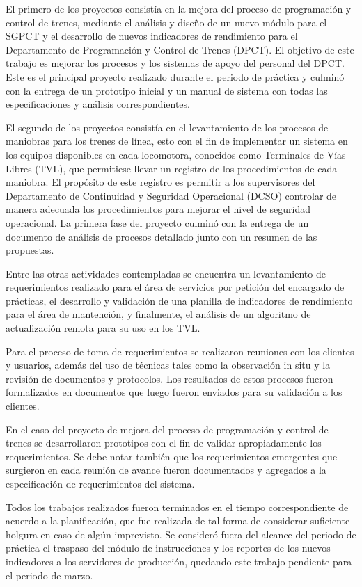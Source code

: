 \documentclass[oneside,12pt, letterpaper, titlepage]{book}
\begin{document}
El primero de los proyectos consistía en la mejora del proceso de programación y control de trenes, mediante el análisis y diseño de un nuevo módulo para el SGPCT y el desarrollo de nuevos indicadores de rendimiento para el Departamento de Programación y Control de Trenes (DPCT). El objetivo de este trabajo es mejorar los procesos y los sistemas de apoyo del personal del DPCT. Este es el principal proyecto realizado durante el periodo de práctica y culminó con la entrega de un prototipo inicial y un manual de sistema con todas las especificaciones y análisis correspondientes. 

El segundo de los proyectos consistía en el levantamiento de los procesos de maniobras para los trenes de línea, esto con el fin de implementar un sistema en los equipos disponibles en cada locomotora, conocidos como Terminales de Vías Libres (TVL), que permitiese llevar un registro de los procedimientos de cada maniobra. El propósito de este registro es permitir a los supervisores del Departamento de Continuidad y Seguridad Operacional (DCSO) controlar de manera adecuada los procedimientos para mejorar el nivel de seguridad operacional. La primera fase del proyecto culminó con la entrega de un documento de análisis de procesos detallado junto con un resumen de las propuestas.

Entre las otras actividades contempladas se encuentra un levantamiento de requerimientos realizado para el área de servicios por petición del encargado de prácticas, el desarrollo y validación de una planilla de indicadores de rendimiento para el área de mantención, y finalmente, el análisis de un algoritmo de actualización remota para su uso en los TVL.

Para el proceso de toma de requerimientos se realizaron reuniones con los clientes y usuarios, además del uso de técnicas tales como la observación in situ y la revisión de documentos y protocolos. Los resultados de estos procesos fueron formalizados en documentos que luego fueron enviados para su validación a los clientes.

En el caso del proyecto de mejora del proceso de programación y control de trenes se desarrollaron prototipos con el fin de validar apropiadamente los requerimientos. Se debe notar también que los requerimientos emergentes que surgieron en cada reunión de avance fueron documentados y agregados a la especificación de requerimientos del sistema.

Todos los trabajos realizados fueron terminados en el tiempo correspondiente de acuerdo a la planificación, que fue realizada de tal forma de considerar suficiente holgura en caso de algún imprevisto. Se consideró fuera del alcance del periodo de práctica el traspaso del módulo de instrucciones y los reportes de los nuevos indicadores a los servidores de producción, quedando este trabajo pendiente para el periodo de marzo. 
\end{document}

